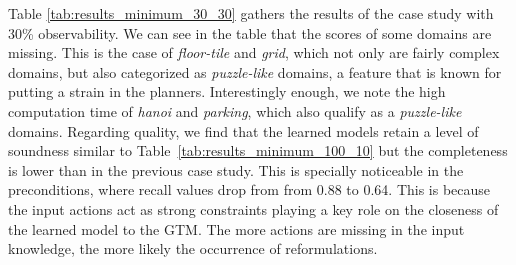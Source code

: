 Table \ref{tab:results_minimum_30_30} gathers the results of the case study with 30\% observability.  We can see in the table that the scores of some domains are missing. This is the case of {\em floor-tile} and {\em grid}, which not only are fairly complex domains, but also categorized as \emph{puzzle-like} domains, a feature that is known for putting a strain in the planners. Interestingly enough, we note the high computation time of {\em hanoi} and {\em parking}, which also qualify as a \emph{puzzle-like} domains. Regarding quality, we find that the learned models retain a level of soundness similar to Table~\ref{tab:results_minimum_100_10} but the completeness is lower than in the previous case study. This is specially noticeable in the preconditions, where recall values drop from from 0.88 to 0.64. This is because the input actions act as strong constraints playing a key role on the closeness of the learned model to the GTM. The more actions are missing in the input knowledge, the more likely the occurrence of reformulations.

